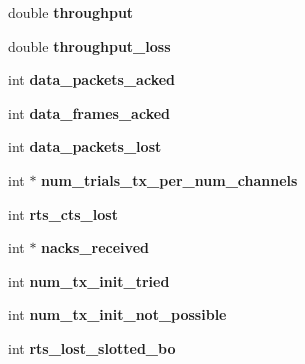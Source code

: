 \begin{DoxyCompactItemize}
\item 
\mbox{\label{classcompcxx__Node__23_a04134389f7bbece80290f7f7633460a8}} 
double {\bfseries throughput}
\item 
\mbox{\label{classcompcxx__Node__23_a350c2bdc29e9df982d3d757784265202}} 
double {\bfseries throughput\+\_\+loss}
\item 
\mbox{\label{classcompcxx__Node__23_a7a18b29404125ea6a04584d1b09afab2}} 
int {\bfseries data\+\_\+packets\+\_\+acked}
\item 
\mbox{\label{classcompcxx__Node__23_a547c4cbce5ed8345099f73515291cdfd}} 
int {\bfseries data\+\_\+frames\+\_\+acked}
\item 
\mbox{\label{classcompcxx__Node__23_a335d875f1babd73465c6523669fcc71a}} 
int {\bfseries data\+\_\+packets\+\_\+lost}
\item 
\mbox{\label{classcompcxx__Node__23_afbf0bb4bee61bbb18856da27d2e1182a}} 
int $\ast$ {\bfseries num\+\_\+trials\+\_\+tx\+\_\+per\+\_\+num\+\_\+channels}
\item 
\mbox{\label{classcompcxx__Node__23_afd1e631f0ee0f1fe9b79ab46b36b592b}} 
int {\bfseries rts\+\_\+cts\+\_\+lost}
\item 
\mbox{\label{classcompcxx__Node__23_a544db196d917e9c9bce8e31ffb3ccb31}} 
int $\ast$ {\bfseries nacks\+\_\+received}
\item 
\mbox{\label{classcompcxx__Node__23_a6725193a1556dd8d6939dd6e842fe6ef}} 
int {\bfseries num\+\_\+tx\+\_\+init\+\_\+tried}
\item 
\mbox{\label{classcompcxx__Node__23_aed68235dfaba63afb7118f116b20b548}} 
int {\bfseries num\+\_\+tx\+\_\+init\+\_\+not\+\_\+possible}
\item 
\mbox{\label{classcompcxx__Node__23_aea39926bb74a71a860a706e45578f107}} 
int {\bfseries rts\+\_\+lost\+\_\+slotted\+\_\+bo}

\end{DoxyCompactItemize}
